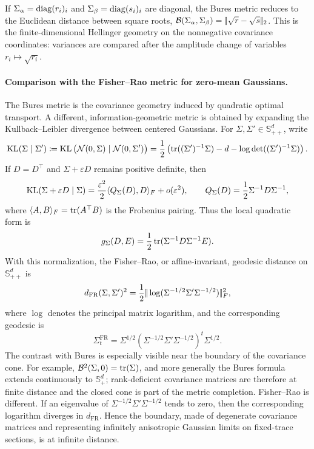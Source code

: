 \begin{rem}
	If $\Sigma_\alpha=\operatorname{diag}(r_i)_i$ and $\Sigma_\beta=\operatorname{diag}(s_i)_i$ are diagonal, the Bures metric reduces to the Euclidean distance between square roots,
	$\mathcal{B}(\Sigma_\alpha,\Sigma_\beta)=|\!| \sqrt r-\sqrt s |\!|_2$.
	This is the finite-dimensional Hellinger geometry on the nonnegative covariance coordinates: variances are compared after the amplitude change of variables $r_i\mapsto\sqrt{r_i}$.
\end{rem}

\paragraph{Comparison with the Fisher--Rao metric for zero-mean Gaussians.}
The Bures metric is the covariance geometry induced by quadratic optimal transport. A different, information-geometric metric is obtained by expanding the Kullback--Leibler divergence between centered Gaussians. For $\Sigma,\Sigma'\in\mathbb S_{++}^d$, write
\[
	\operatorname{KL}(\Sigma\mid\Sigma')
	\coloneqq
	\operatorname{KL}\big(\mathcal{N}(0,\Sigma)\mid\mathcal{N}(0,\Sigma')\big)
	=
	\frac12\left(
	\operatorname{tr}((\Sigma')^{-1}\Sigma)-d-\log\det((\Sigma')^{-1}\Sigma)
	\right).
\]
If $D=D^\top$ and $\Sigma+\varepsilon D$ remains positive definite, then
\[
	\operatorname{KL}(\Sigma+\varepsilon D\mid\Sigma)
	=
	\frac{\varepsilon^2}{2}\langle Q_\Sigma(D),D\rangle_F+o(\varepsilon^2),
	\qquad
	Q_\Sigma(D)=\frac12\Sigma^{-1}D\Sigma^{-1},
\]
where $\langle A,B\rangle_F=\operatorname{tr}(A^\top B)$ is the Frobenius pairing. Thus the local quadratic form is
\[
	g_\Sigma(D,E)=\frac12\operatorname{tr}(\Sigma^{-1}D\Sigma^{-1}E).
\]
With this normalization, the Fisher--Rao, or affine-invariant, geodesic distance on $\mathbb S_{++}^d$ is
\[
	d_{\mathrm{FR}}(\Sigma,\Sigma')^2
	=
	\frac12
	|\!| \log(\Sigma^{-1/2}\Sigma'\Sigma^{-1/2}) |\!|_F^2,
\]
where $\log$ denotes the principal matrix logarithm, and the corresponding geodesic is
\[
	\Sigma_t^{\mathrm{FR}}
	=
	\Sigma^{1/2}
	\left(\Sigma^{-1/2}\Sigma'\Sigma^{-1/2}\right)^t
	\Sigma^{1/2}.
\]
The contrast with Bures is especially visible near the boundary of the covariance cone. For example, $\mathcal{B}^2(\Sigma,0)=\operatorname{tr}(\Sigma)$, and more generally the Bures formula extends continuously to $\mathbb S_+^d$; rank-deficient covariance matrices are therefore at finite distance and the closed cone is part of the metric completion. Fisher--Rao is different. If an eigenvalue of $\Sigma^{-1/2}\Sigma'\Sigma^{-1/2}$ tends to zero, then the corresponding logarithm diverges in $d_{\mathrm{FR}}$. Hence the boundary, made of degenerate covariance matrices and representing infinitely anisotropic Gaussian limits on fixed-trace sections, is at infinite distance.

